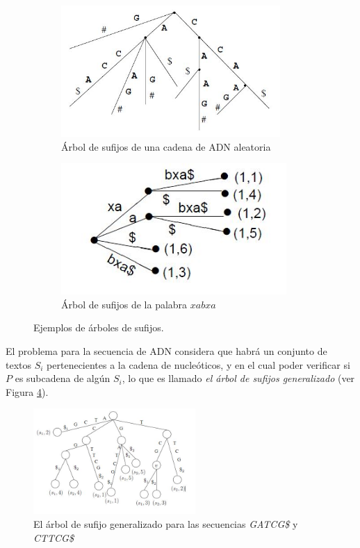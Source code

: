 \begin{figure}[h]

\begin{subfigure}{0.5\textwidth}
\includegraphics[width=0.9\linewidth, height=5cm]{./images/suffixtree1.JPG} 
\caption{Árbol de sufijos de una cadena de ADN aleatoria}
\label{fig:subim5}
\end{subfigure}
\begin{subfigure}{0.5\textwidth}
\includegraphics[width=0.9\linewidth, height=5cm]{./images/suffixtree2.JPG}
\caption{Árbol de sufijos de la palabra $xabxa$}
\label{fig:subim6}
\end{subfigure}
 
\caption{Ejemplos de árboles de sufijos.}
\label{fig:image3}
\end{figure}

El problema para la secuencia de ADN considera que habrá un conjunto de textos $S_{i}$ pertenecientes a la cadena de nucleóticos, y en el cual poder verificar si $P$ es subcadena de algún $S_{i}$, lo que es llamado {\it{el árbol de sufijos generalizado}} (ver Figura \ref{fig:mesh1}). 

\begin{figure}[h]
    \centering
    \includegraphics[width=0.55\textwidth]{./images/suffixtree3.JPG}
    \caption{El árbol de sufijo generalizado para las secuencias {\it{GATCG\$}} y {\it{CTTCG\$}} \cite{koaluru}}
    \label{fig:mesh1}
\end{figure}

